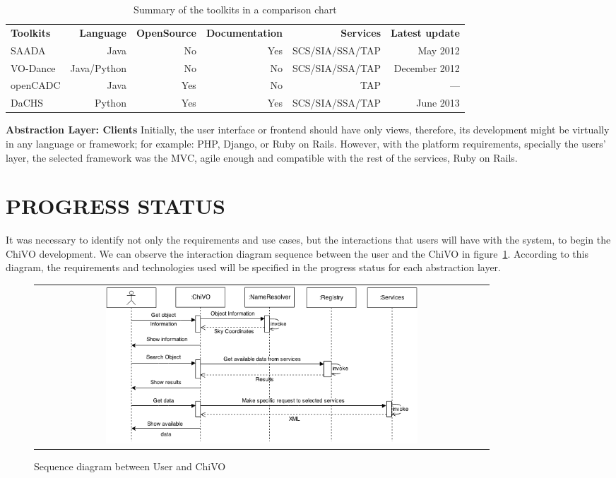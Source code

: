 \documentclass[]{spie}
\begin{document}
\begin{table}[h]
\caption{Summary of the toolkits in a comparison chart} 
\label{table:toolkits}
\begin{center}       
\begin{tabular}{lrrrrr}
    {\bf Toolkits} & {\bf Language} & {\bf OpenSource} & {\bf Documentation} & {\bf Services} & {\bf Latest update}  \\
    SAADA          & Java           & No               & Yes                  & SCS/SIA/SSA/TAP & May 2012     \\
    VO-Dance       & Java/Python    & No               & No                  & SCS/SIA/SSA/TAP & December 2012 \\
    openCADC       & Java           & Yes               & No                  & TAP             & ---           \\
    DaCHS          & Python         & Yes               & Yes                  & SCS/SIA/SSA/TAP & June 2013    \\
\end{tabular}
\end{center}
\end{table}

\textbf{Abstraction Layer:  Clients}
Initially, the user interface or frontend should have only views, therefore,
its development might be virtually in any language or framework; for example:
PHP, Django, or Ruby on Rails.  However, with the platform requirements,
specially the users' layer, the selected framework was the MVC, agile enough
and compatible with the rest of the services, Ruby on Rails.


\section{PROGRESS STATUS}
It was necessary to identify not only the requirements and use cases, but the
interactions that users will have with the system, to begin the ChiVO
development.  We can observe the interaction diagram sequence between the user
and the ChiVO in figure~\ref{fig:secuencia}.  According to this diagram, the
requirements and technologies used will be specified in the progress status for
each abstraction layer.

\begin{figure}
   \begin{center}
   \begin{tabular}{c}
   \includegraphics[width=0.7\textwidth]{images/secuencia.png}
   \end{tabular}
   \end{center}
   \caption[example]
   { \label{fig:secuencia} Sequence diagram between User and ChiVO}
\end{figure}
\end{document}
